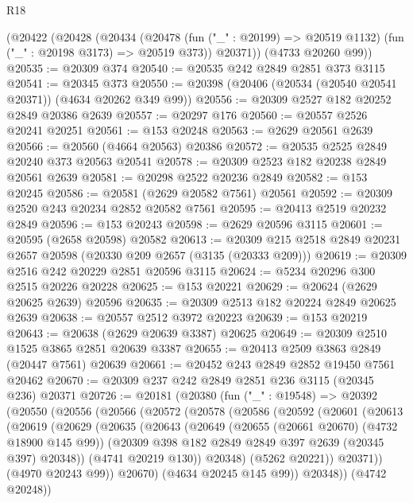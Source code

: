 \begin{lexlean}{R18}
\begin{coremodule}
    (@20422
      (@20428
        (@20434
          (@20478 (fun ("_" : @20199) => @20519 @1132) (fun ("_" : @20198 @3173) => @20519 @373))
          @20371))
      (@4733 @20260 @99))
@20535 := @20309 @374
@20540 := @20535 @242 @2849 @2851 @373 @3115
@20541 := @20345 @373
@20550 := @20398 (@20406 (@20534 (@20540 @20541 @20371)) (@4634 @20262 @349 @99))
@20556 := @20309 @2527 @182 @20252 @2849 @20386 @2639
@20557 := @20297 @176
@20560 := @20557 @2526 @20241 @20251
@20561 := @153 @20248
@20563 := @2629 @20561 @2639
@20566 := @20560 (@4664 @20563) @20386
@20572 := @20535 @2525 @2849 @20240 @373 @20563 @20541
@20578 := @20309 @2523 @182 @20238 @2849 @20561 @2639
@20581 := @20298 @2522 @20236 @2849
@20582 := @153 @20245
@20586 := @20581 (@2629 @20582 @7561) @20561
@20592 := @20309 @2520 @243 @20234 @2852 @20582 @7561
@20595 := @20413 @2519 @20232 @2849
@20596 := @153 @20243
@20598 := @2629 @20596 @3115
@20601 := @20595 (@2658 @20598) @20582
@20613 := @20309 @215 @2518 @2849 @20231 @2657 @20598 (@20330 @209 @2657 (@3135 (@20333 @209)))
@20619 := @20309 @2516 @242 @20229 @2851 @20596 @3115
@20624 := @5234 @20296 @300 @2515 @20226 @20228
@20625 := @153 @20221
@20629 := @20624 (@2629 @20625 @2639) @20596
@20635 := @20309 @2513 @182 @20224 @2849 @20625 @2639
@20638 := @20557 @2512 @3972 @20223
@20639 := @153 @20219
@20643 := @20638 (@2629 @20639 @3387) @20625
@20649 := @20309 @2510 @1525 @3865 @2851 @20639 @3387
@20655 := @20413 @2509 @3863 @2849 (@20447 @7561) @20639
@20661 := @20452 @243 @2849 @2852 @19450 @7561 @20462
@20670 := @20309 @237 @242 @2849 @2851 @236 @3115 (@20345 @236) @20371
@20726 := @20181
    (@20380
      (fun ("_" : @19548) =>
      @20392
        (@20550
          (@20556
            (@20566
              (@20572
                (@20578
                  (@20586
                    (@20592
                      (@20601
                        (@20613
                          (@20619
                            (@20629
                              (@20635
                                (@20643
                                  (@20649
                                    (@20655 (@20661 @20670) (@4732 @18900 @145 @99))
                                    (@20309 @398 @182 @2849 @2849 @397 @2639 (@20345 @397) @20348))
                                  (@4741 @20219 @130))
                                @20348)
                              (@5262 @20221))
                            @20371))
                        (@4970 @20243 @99))
                      @20670)
                    (@4634 @20245 @145 @99))
                  @20348))
              (@4742 @20248))

\end{coremodule}
\end{lexlean}
